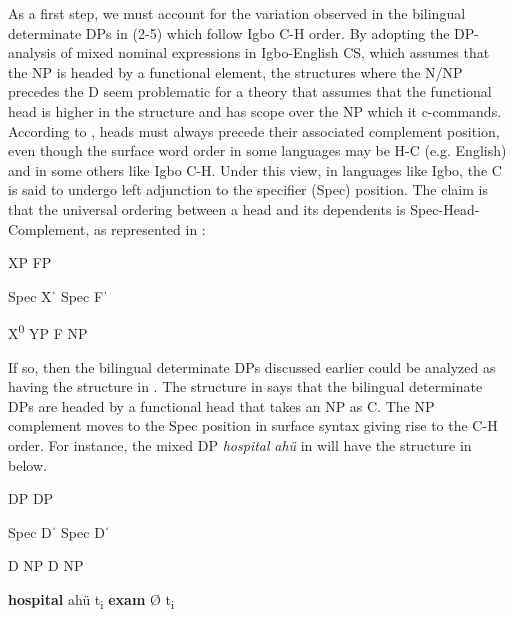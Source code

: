 \documentclass[output=paper]{langsci/langscibook}
\begin{document}
As a first step, we must account for the variation observed in the bilingual determinate DPs in (2-5) which follow Igbo C-H order. By adopting the DP-analysis of mixed nominal expressions in Igbo-English CS, which assumes that the NP is headed by a functional element, the structures where the N/NP precedes the D seem problematic for a theory that assumes that the functional head is higher in the structure and has scope over the NP which it c-commands. According to \citet{Kayne1994}, heads must always precede their associated complement position, even though the surface word order in some languages may be H-C (e.g. English) and in some others like Igbo C-H. Under this view, in languages like Igbo, the C is said to undergo left adjunction to the specifier (Spec) position. The claim is that the universal ordering between a head and its dependents is Spec-Head-Complement, as represented in :

\ea%
    \label{ex:14}
 

	      XP          FP

Spec    Xˈ      Spec    Fˈ

      X\textsuperscript{0}    YP      F    NP        
\z

If so, then the bilingual determinate DPs discussed earlier could be analyzed as having the structure in . The structure in  says that the bilingual determinate DPs are headed by a functional head that takes an NP as C. The NP complement moves to the Spec position in surface syntax giving rise to the C-H order. For instance, the mixed DP \textit{hospital}\textbf{\textit{}} \textit{ahü} in  will have the structure in  below.

\ea%

	    DP            DP

  Spec       Dˈ      Spec      Dˈ

      D    NP        D    NP
\z

         \textbf{hospital}            ahü     t\textsubscript{i}    \textbf{exam}    Ø    t\textsubscript{i}
\end{document}
